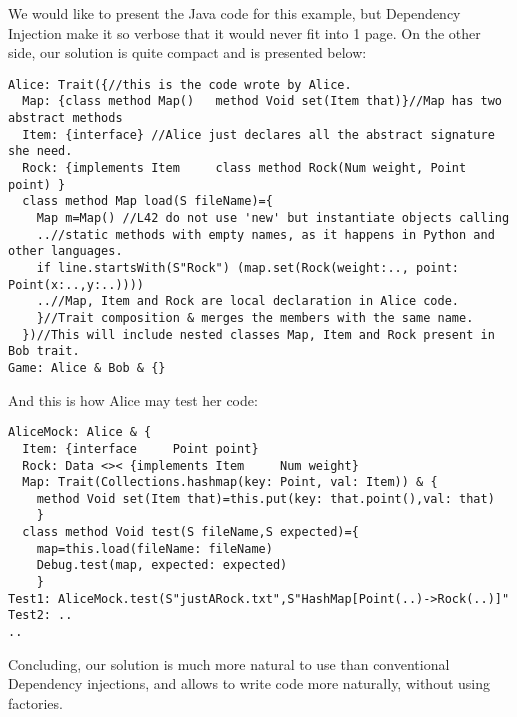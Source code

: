 \documentclass[a4paper,twoside,british,9pt]{extarticle}
\begin{document}
We would like to present the Java code for this example, but
Dependency Injection make it so verbose that it would
never fit into 1 page. On the other side, our solution 
is quite compact and is presented below:
\vspace{-1ex}
\begin{lstlisting}
Alice: Trait({//this is the code wrote by Alice.
  Map: {class method Map()   method Void set(Item that)}//Map has two abstract methods
  Item: {interface} //Alice just declares all the abstract signature she need.
  Rock: {implements Item     class method Rock(Num weight, Point point) }
  class method Map load(S fileName)={
    Map m=Map() //L42 do not use 'new' but instantiate objects calling
    ..//static methods with empty names, as it happens in Python and other languages.
    if line.startsWith(S"Rock") (map.set(Rock(weight:.., point: Point(x:..,y:..))))
    ..//Map, Item and Rock are local declaration in Alice code.
    }//Trait composition & merges the members with the same name.
  })//This will include nested classes Map, Item and Rock present in Bob trait.
Game: Alice & Bob & {}          
\end{lstlisting}

And this is how Alice may test her code:
\begin{lstlisting}
AliceMock: Alice & {
  Item: {interface     Point point}
  Rock: Data <>< {implements Item     Num weight}
  Map: Trait(Collections.hashmap(key: Point, val: Item)) & {
    method Void set(Item that)=this.put(key: that.point(),val: that)
    }
  class method Void test(S fileName,S expected)={
    map=this.load(fileName: fileName)
    Debug.test(map, expected: expected)
    }
Test1: AliceMock.test(S"justARock.txt",S"HashMap[Point(..)->Rock(..)]"
Test2: ..
..
\end{lstlisting}
\vspace{-1ex}
Concluding, our solution is much more natural to use than conventional Dependency injections,
and allows to write code more naturally, without using factories.
\end{document}
